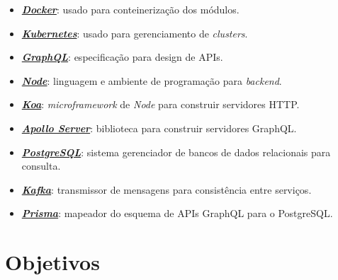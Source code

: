 \documentclass[10pt,twoside,a4paper]{article}
\begin{document}
    \begin{itemize}
        \item \href{https://www.docker.com/}{\textbf{\textit{Docker}}}: usado para conteinerização dos módulos.
        \item \href{https://kubernetes.io/}{\textbf{\textit{Kubernetes}}}: usado para gerenciamento de \textit{clusters}.
        \item \href{https://graphql.org/}{\textbf{\textit{GraphQL}}}: especificação para design de APIs.
        \item \href{https://nodejs.org/en/}{\textbf{\textit{Node}}}: linguagem e ambiente de programação para \textit{backend}.
        \item \href{https://koajs.com/}{\textbf{\textit{Koa}}}: \textit{microframework} de \textit{Node} para construir servidores HTTP.
        \item \href{https://www.apollographql.com/server}{\textbf{\textit{Apollo Server}}}: biblioteca para construir servidores GraphQL.
        \item \href{https://www.postgresql.org/}{\textbf{\textit{PostgreSQL}}}: sistema gerenciador de bancos de dados relacionais para consulta.
        \item \href{https://kafka.apache.org/}{\textbf{\textit{Kafka}}}: transmissor de mensagens para consistência entre serviços.
        \item \href{https://prisma.io/}{\textbf{\textit{Prisma}}}: mapeador do esquema de APIs GraphQL para o PostgreSQL.
    \end{itemize}
    
  

\section{Objetivos}
\end{document}
